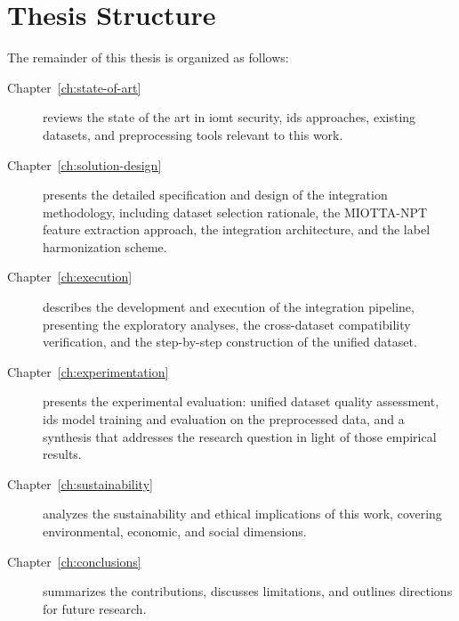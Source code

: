 \section{Thesis Structure}
\label{sec:structure}

The remainder of this thesis is organized as follows:

\begin{description}
    \item[Chapter~\ref{ch:state-of-art}] reviews the state of the art in \gls{iomt} security, \gls{ids} approaches, existing datasets, and preprocessing tools relevant to this work.

    \item[Chapter~\ref{ch:solution-design}] presents the detailed specification and design of the integration methodology, including dataset selection rationale, the MIOTTA-NPT feature extraction approach, the integration architecture, and the label harmonization scheme.

    \item[Chapter~\ref{ch:execution}] describes the development and execution of the integration pipeline, presenting the exploratory analyses, the cross-dataset compatibility verification, and the step-by-step construction of the unified dataset.

    \item[Chapter~\ref{ch:experimentation}] presents the experimental evaluation: unified dataset quality assessment, \gls{ids} model training and evaluation on the preprocessed data, and a synthesis that addresses the research question in light of those empirical results.

    \item[Chapter~\ref{ch:sustainability}] analyzes the sustainability and ethical implications of this work, covering environmental, economic, and social dimensions.

    \item[Chapter~\ref{ch:conclusions}] summarizes the contributions, discusses limitations, and outlines directions for future research.
\end{description}
